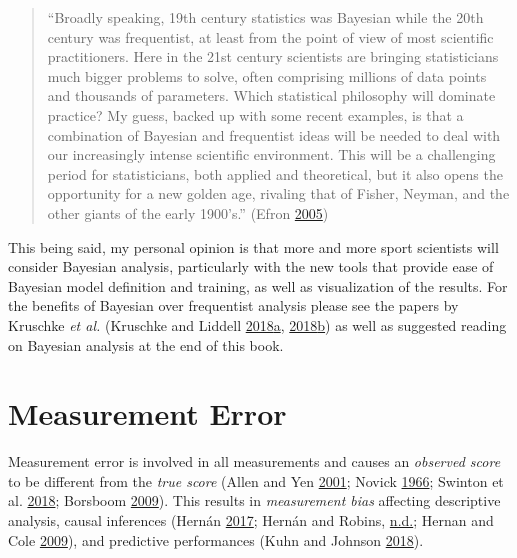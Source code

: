 \documentclass[
]{book}
\begin{document}
\begin{quote}
``Broadly speaking, 19th century statistics was Bayesian while the 20th century was frequentist, at least from the point of view of most scientific practitioners. Here in the 21st century scientists are bringing statisticians much bigger problems to solve, often comprising millions of data points and thousands of parameters. Which statistical philosophy will dominate practice? My guess, backed up with some recent examples, is that a combination of Bayesian and frequentist ideas will be needed to deal with our increasingly intense scientific environment. This will be a challenging period for statisticians, both applied and theoretical, but it also opens the opportunity for a new golden age, rivaling that of Fisher, Neyman, and the other giants of the early 1900's.'' (Efron \protect\hyperlink{ref-efronBayesiansFrequentistsScientists2005}{2005})
\end{quote}

This being said, my personal opinion is that more and more sport scientists will consider Bayesian analysis, particularly with the new tools that provide ease of Bayesian model definition and training, as well as visualization of the results. For the benefits of Bayesian over frequentist analysis please see the papers by Kruschke \emph{et al.} (Kruschke and Liddell \protect\hyperlink{ref-kruschkeBayesianDataAnalysis2018}{2018}\protect\hyperlink{ref-kruschkeBayesianDataAnalysis2018}{a}, \protect\hyperlink{ref-kruschkeBayesianNewStatistics2018}{2018}\protect\hyperlink{ref-kruschkeBayesianNewStatistics2018}{b}) as well as suggested reading on Bayesian analysis at the end of this book.

\hypertarget{measurement-error}{%
\chapter{Measurement Error}\label{measurement-error}}

Measurement error is involved in all measurements and causes an \emph{observed score} to be different from the \emph{true score} (Allen and Yen \protect\hyperlink{ref-allenIntroductionMeasurementTheory2001}{2001}; Novick \protect\hyperlink{ref-novickAxiomsPrincipalResults1966}{1966}; Swinton et al. \protect\hyperlink{ref-swintonStatisticalFrameworkInterpret2018}{2018}; Borsboom \protect\hyperlink{ref-borsboomMeasuringMindConceptual2009}{2009}). This results in \emph{measurement bias} affecting descriptive analysis, causal inferences (Hernán \protect\hyperlink{ref-hernanCausalDiagramsDraw2017}{2017}; Hernán and Robins, \protect\hyperlink{ref-hernanCausalInference2019}{n.d.}; Hernan and Cole \protect\hyperlink{ref-hernanInvitedCommentaryCausal2009}{2009}), and predictive performances (Kuhn and Johnson \protect\hyperlink{ref-kuhnAppliedPredictiveModeling2018}{2018}).
\end{document}
